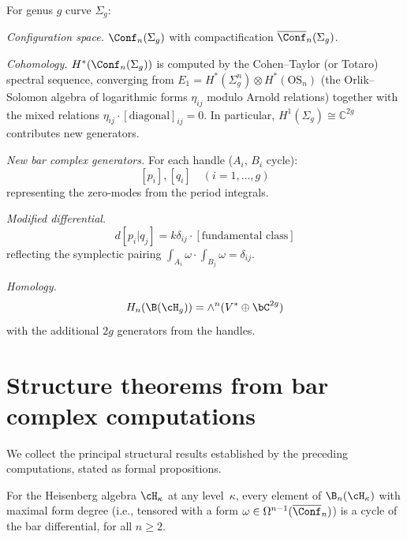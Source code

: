 \begin{computation}\label{comp:bar-genus-g}
For genus $g$ curve $\Sigma_g$:

\emph{Configuration space.} $\Conf_n(\Sigma_g)$ with compactification
$\overline{\Conf}_n(\Sigma_g)$.

\emph{Cohomology.}
$H^*(\Conf_n(\Sigma_g))$ is computed by the Cohen--Taylor (or Totaro) spectral sequence, converging from $E_1 = H^*(\Sigma_g^n) \otimes H^*(\text{OS}_n)$ (the Orlik--Solomon algebra of logarithmic forms $\eta_{ij}$ modulo Arnold relations) together with the mixed relations $\eta_{ij} \cdot [\text{diagonal}]_{ij} = 0$.  In particular, $H^1(\Sigma_g) \cong \mathbb{C}^{2g}$ contributes new generators.

\emph{New bar complex generators.} For each handle ($A_i$, $B_i$ cycle):
\[
[p_i], [q_i] \quad (i = 1, \ldots, g)
\]
representing the zero-modes from the period integrals.

\emph{Modified differential.}
\[
d[p_i | q_j] = k\delta_{ij} \cdot [\text{fundamental class}]
\]
reflecting the symplectic pairing $\int_{A_i} \omega \cdot \int_{B_j} \omega = \delta_{ij}$.

\emph{Homology.}
\[
H_n(\B(\cH_g)) = \wedge^n(V^* \oplus \bC^{2g})
\]
with the additional $2g$ generators from the handles.
\end{computation}


\section{Structure theorems from bar complex computations}
\label{sec:bar-structure-theorems}

We collect the principal structural results established by the preceding
computations, stated as formal propositions.

\begin{proposition}
\label{prop:heisenberg-maximal-form-cycles}
For the Heisenberg algebra $\cH_\kappa$ at any level~$\kappa$, every element
of $\B_n(\cH_\kappa)$ with maximal form degree (i.e., tensored with a form
$\omega \in \Omega^{n-1}(\overline{\Conf}_n)$) is a cycle of the bar
differential, for all $n \geq 2$.
\end{proposition}

